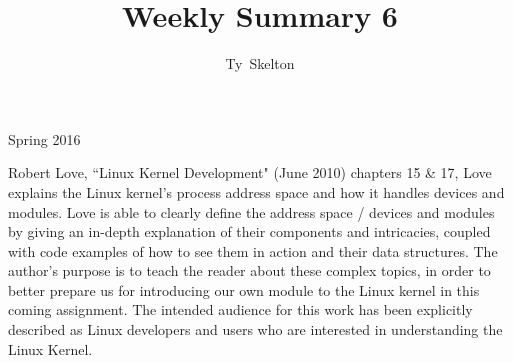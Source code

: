\documentclass[10pt,draftclsnofoot,onecolumn]{IEEEtran}
\begin{document}
\singlespacing
\title{Weekly Summary 6}

\author{Ty~Skelton}

{Spring 2016}

\maketitle
\IEEEpeerreviewmaketitle

Robert Love, ``Linux Kernel Development" (June 2010) chapters 15 \& 17, Love explains the Linux kernel's process address space and how it handles devices and modules.
Love is able to clearly define the address space / devices and modules by giving an in-depth explanation of their components and intricacies, coupled with code examples of how to see them in action and their data structures.
The author's purpose is to teach the reader about these complex topics, in order to better prepare us for introducing our own module to the Linux kernel in this coming assignment.
The intended audience for this work has been explicitly described as Linux developers and users who are interested in understanding the Linux Kernel.
\end{document}
